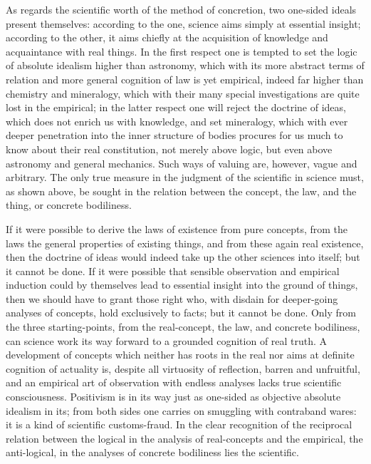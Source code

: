\documentclass[12pt]{book}
\begin{document}
As regards the scientific worth of the method of concretion, two one-sided ideals
present themselves: according to the one, science aims simply at essential insight;
according to the other, it aims chiefly at the acquisition of knowledge and
acquaintance with real things. In the first respect one is tempted to set the logic of
absolute idealism higher than astronomy, which with its more abstract terms of relation
and more general cognition of law is yet empirical, indeed far higher than chemistry and
mineralogy, which with their many special investigations are quite lost in the empirical;
in the latter respect one will reject the doctrine of ideas, which does not enrich us
with knowledge, and set mineralogy, which with ever deeper penetration into the inner
structure of bodies procures for us much to know about their real constitution, not
merely above logic, but even above astronomy and general mechanics. Such ways of valuing
are, however, vague and arbitrary. The only true measure in the judgment of the
scientific in science must, as shown above, be sought in the relation between the
concept, the law, and the thing, or concrete bodiliness.

If it were possible to derive the laws of existence from pure concepts, from the laws
the general properties of existing things, and from these again real existence, then the
doctrine of ideas would indeed take up the other sciences into itself; but it cannot be
done. If it were possible that sensible observation and empirical induction could by
themselves lead to essential insight into the ground of things, then we should have to
grant those right who, with disdain for deeper-going analyses of concepts, hold
exclusively to facts; but it cannot be done. Only from the three starting-points, from
the real-concept, the law, and concrete bodiliness, can science work its way forward to
a grounded cognition of real truth. A development of concepts which neither has roots in
the real nor aims at definite cognition of actuality is, despite all virtuosity of
reflection, barren and unfruitful, and an empirical art of observation with endless
analyses lacks true scientific consciousness. Positivism is in its way just as one-sided
as objective absolute idealism in its; from both sides one carries on smuggling with
contraband wares: it is a kind of scientific customs-fraud. In the clear recognition of
the reciprocal relation between the logical in the analysis of real-concepts and the
empirical, the anti-logical, in the analyses of concrete bodiliness lies the scientific.
\end{document}
